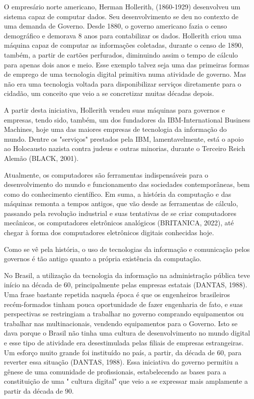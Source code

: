 O empresário norte americano, Herman Hollerith, (1860-1929) desenvolveu um sistema capaz de computar dados. Seu desenvolvimento se deu no contexto de uma demanda de Governo. Desde 1880, o governo americano fazia o censo demográfico e demorava 8 anos para contabilizar os dados. Hollerith criou uma máquina capaz de computar as informações coletadas, durante o censo de 1890, também, a partir de cartões perfurados, diminuindo assim o tempo de cálculo para apenas dois anos e meio. Esse exemplo talvez seja uma das primeiras formas de emprego de uma tecnologia digital primitiva numa atividade de governo. Mas não era uma tecnologia voltada para disponibilizar serviços diretamente para o cidadão, um conceito que veio a se concretizar muitas décadas depois.

A partir desta iniciativa, Hollerith vendeu suas máquinas para governos e empresas, tendo sido, também, um dos fundadores da IBM-International Business Machines, hoje uma das maiores empresas de tecnologia da informação do mundo. Dentre os "serviços" prestados pela IBM, lamentavelmente, está o apoio ao Holocausto nazista contra judeus e outras minorias, durante o Terceiro Reich Alemão (BLACK, 2001).

Atualmente, os computadores são ferramentas indispensáveis para o desenvolvimento do mundo e funcionamento das sociedades contemporâneas, bem como do conhecimento científico. Em suma, a história da computação e das máquinas remonta a tempos antigos, que vão desde as ferramentas de cálculo, passando pela revolução industrial e suas tentativas de se criar computadores mecânicos, os computadores eletrônicos analógicos  (BRITANICA, 2022), até chegar à forma dos computadores eletrônicos digitais conhecidas hoje.

Como se vê pela história, o uso de tecnologias da informação e comunicação pelos governos é tão antigo quanto a própria existência da computação.

No Brasil, a utilização da tecnologia da informação na administração pública teve início na década de 60, principalmente pelas empresas estatais (DANTAS, 1988). Uma frase bastante repetida naquela época é que os engenheiros brasileiros recém-formados tinham pouca oportunidade de fazer engenharia de fato, e suas perspectivas se restringiam a trabalhar no governo comprando equipamentos ou trabalhar nas multinacionais, vendendo equipamentos para o Governo. Isto se dava porque o Brasil não tinha uma cultura de desenvolvimento no mundo digital e esse tipo de atividade era desestimulada pelas filiais de empresas estrangeiras. Um esforço muito grande foi instituído no país, a partir, da década de 60, para reverter essa situação (DANTAS, 1988). Essa iniciativa do governo permitiu a gênese de uma comunidade de profissionais, estabelecendo as bases para a constituição de uma " cultura digital" que veio a se expressar mais amplamente a partir da década de 90.

